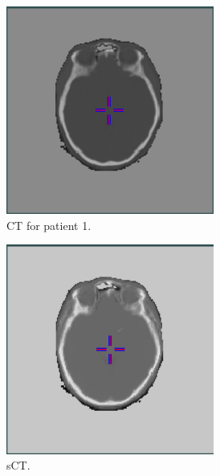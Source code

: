 \begin{figure}[H]
    \centering
    \begin{subfigure}[b]{0.3\textwidth}
        \centering
        \includegraphics[width=0.75\textwidth]{colager/loocv_ct/loocv_010476_ct.png}
        \caption{CT for patient 1.}
        \label{col:loocv_ct_pat1_ct}
    \end{subfigure}\hfill
    \begin{subfigure}[b]{0.3\textwidth}
        \centering
        \includegraphics[width=0.75\textwidth]{colager/loocv_ct/loocv_010476_sct.png}
        \caption{sCT.}
        \label{col:loocv_ct_pat1_sct}
    \end{subfigure}\hfill
    \begin{subfigure}[b]{0.3\textwidth}

\end{subfigure}
\end{figure}
